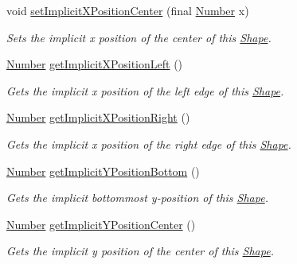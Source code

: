 \begin{DoxyCompactItemize}
void \hyperlink{classcom_1_1aarrelaakso_1_1drawl_1_1_shape_a945597709a9d79688e48a9802c86b13b}{set\+Implicit\+X\+Position\+Center} (final \hyperlink{interfacecom_1_1aarrelaakso_1_1drawl_1_1_number}{Number} x)
\begin{DoxyCompactList}\small\item\em Sets the implicit x position of the center of this \hyperlink{classcom_1_1aarrelaakso_1_1drawl_1_1_shape}{Shape}. \end{DoxyCompactList}\item 
\hyperlink{interfacecom_1_1aarrelaakso_1_1drawl_1_1_number}{Number} \hyperlink{classcom_1_1aarrelaakso_1_1drawl_1_1_shape_a2f272e8bfa625bb7959d1f722d5ac3df}{get\+Implicit\+X\+Position\+Left} ()
\begin{DoxyCompactList}\small\item\em Gets the implicit x position of the left edge of this \hyperlink{classcom_1_1aarrelaakso_1_1drawl_1_1_shape}{Shape}. \end{DoxyCompactList}\item 
\hyperlink{interfacecom_1_1aarrelaakso_1_1drawl_1_1_number}{Number} \hyperlink{classcom_1_1aarrelaakso_1_1drawl_1_1_shape_a15599ef4ee30a0ddd372f7cf1b155ce1}{get\+Implicit\+X\+Position\+Right} ()
\begin{DoxyCompactList}\small\item\em Gets the implicit x position of the right edge of this \hyperlink{classcom_1_1aarrelaakso_1_1drawl_1_1_shape}{Shape}. \end{DoxyCompactList}\item 
\hyperlink{interfacecom_1_1aarrelaakso_1_1drawl_1_1_number}{Number} \hyperlink{classcom_1_1aarrelaakso_1_1drawl_1_1_shape_a8d44b02976656bf4a81055a2dbae66cb}{get\+Implicit\+Y\+Position\+Bottom} ()
\begin{DoxyCompactList}\small\item\em Gets the implicit bottommost y-\/position of this \hyperlink{classcom_1_1aarrelaakso_1_1drawl_1_1_shape}{Shape}. \end{DoxyCompactList}\item 
\hyperlink{interfacecom_1_1aarrelaakso_1_1drawl_1_1_number}{Number} \hyperlink{classcom_1_1aarrelaakso_1_1drawl_1_1_shape_a1f27f0adc1716dc60691a7d0c14f2ace}{get\+Implicit\+Y\+Position\+Center} ()
\begin{DoxyCompactList}\small\item\em Gets the implicit y position of the center of this \hyperlink{classcom_1_1aarrelaakso_1_1drawl_1_1_shape}{Shape}. \end{DoxyCompactList}\item 

\end{DoxyCompactItemize}

